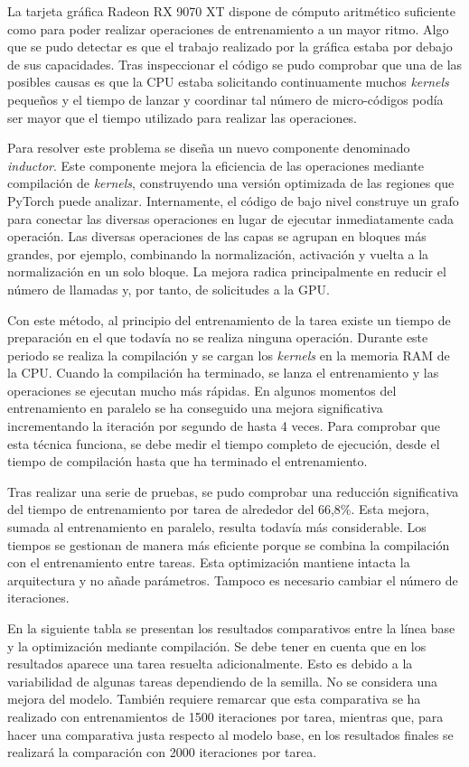 \documentclass[11pt,a4paper,spanish]{book}
\numberwithin{equation}{chapter}
\numberwithin{figure}{chapter}
\begin{document}
La tarjeta gráfica Radeon RX 9070 XT dispone de cómputo aritmético suficiente como para poder realizar operaciones de entrenamiento
a un mayor ritmo. Algo que se pudo detectar es que el trabajo realizado por la gráfica estaba por debajo de sus capacidades. Tras inspeccionar
el código se pudo comprobar que una de las posibles causas es que la CPU estaba solicitando continuamente muchos \textit{kernels} pequeños y
el tiempo de lanzar y coordinar tal número de micro-códigos podía ser mayor que el tiempo utilizado para realizar las operaciones.

Para resolver este problema se diseña un nuevo componente denominado \textit{inductor}. Este componente mejora la eficiencia de las operaciones mediante
compilación de \textit{kernels}, construyendo una versión optimizada de las regiones que PyTorch puede analizar. Internamente, el código de bajo
nivel construye un grafo para conectar las diversas operaciones en lugar de ejecutar inmediatamente cada operación. Las diversas operaciones
de las capas se agrupan en bloques más grandes, por ejemplo, combinando la normalización, activación y vuelta a la normalización en un solo bloque. 
La mejora radica principalmente en reducir el número de llamadas y, por tanto, de solicitudes a la GPU.

Con este método, al principio del entrenamiento de la tarea existe un tiempo de preparación en el que todavía no se realiza ninguna operación.
Durante este periodo se realiza la compilación y se cargan los \textit{kernels} en la memoria RAM de la CPU. Cuando la compilación ha terminado,
se lanza el entrenamiento y las operaciones se ejecutan mucho más rápidas. En algunos momentos del entrenamiento en paralelo se ha conseguido
una mejora significativa incrementando la iteración por segundo de hasta 4 veces. Para comprobar que esta técnica funciona, se debe medir
el tiempo completo de ejecución, desde el tiempo de compilación hasta que ha terminado el entrenamiento.

Tras realizar una serie de pruebas, se pudo comprobar una reducción significativa del tiempo de entrenamiento por tarea de alrededor del 66,8\%. Esta mejora,
sumada al entrenamiento en paralelo, resulta todavía más considerable. Los tiempos se gestionan de manera más eficiente porque
se combina la compilación con el entrenamiento entre tareas. Esta optimización mantiene intacta la arquitectura y no añade parámetros. Tampoco
es necesario cambiar el número de iteraciones.

En la siguiente tabla se presentan los resultados comparativos entre la línea base y la optimización mediante compilación. Se
debe tener en cuenta que en los resultados aparece una tarea resuelta adicionalmente. Esto es debido a la variabilidad
de algunas tareas dependiendo de la semilla. No se considera una mejora del modelo. También requiere remarcar
que esta comparativa se ha realizado con entrenamientos de 1500 iteraciones por tarea, mientras que, para hacer
una comparativa justa respecto al modelo base, en los resultados finales se realizará la comparación con 2000
iteraciones por tarea.
\end{document}
